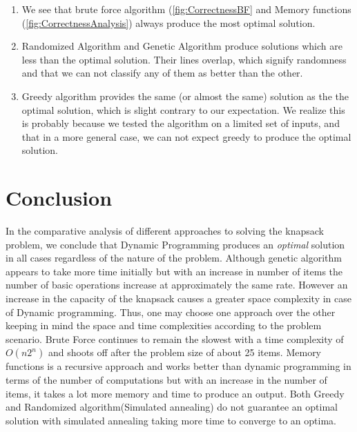 \documentclass[a4paper, 11pt]{article}
\begin{document}
\begin{enumerate}
    \item We see that brute force algorithm (\autoref{fig:CorrectnessBF} and Memory functions (\autoref{fig:CorrectnessAnalysis}) always produce the most optimal solution.
    \item Randomized Algorithm and Genetic Algorithm produce solutions which are less than the optimal solution. Their lines overlap, which signify randomness and that we can not classify any of them as better than the other.
    \item Greedy algorithm provides the same (or almost the same) solution as the the optimal solution, which is slight contrary to our expectation. We realize this is probably because we tested the algorithm on a limited set of inputs, and that in a more general case, we can not expect greedy to produce the optimal solution. 
\end{enumerate}


\newpage 

\section{Conclusion}
In the comparative analysis of different approaches to solving the knapsack problem, we conclude that Dynamic Programming produces an \textit{optimal} solution in all cases regardless of the nature of the problem. Although genetic algorithm appears to take more time initially but with an increase in number of items the number of basic operations increase at approximately the same rate. However an increase in the capacity of the knapsack causes a greater space complexity in case of Dynamic programming. Thus, one may choose one approach over the other keeping in mind the space and time complexities according to the problem scenario. 
Brute Force continues to remain the slowest with a time complexity of $O(n2^n)$ and shoots off after the problem size of about 25 items. Memory functions is a recursive approach and works better than dynamic programming in terms of the number of computations but with an increase in the number of items, it takes a lot more memory and time to produce an output. Both Greedy and Randomized algorithm(Simulated annealing) do not guarantee an optimal solution with simulated annealing taking more time to converge to an optima.
\end{document}
